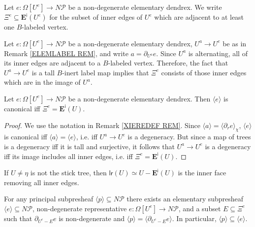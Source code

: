 \documentclass[a4paper,10pt
,draft
]{article}%
\renewcommand{\1}{\eta}%
\begin{document}
\begin{definition}\label{XIEDGES DEF}
Let $e \colon \Omega[U^e] \to N \mathcal{P}$ be a non-degenerate elementary dendrex. 
We write
$\Xi^e \subseteq \boldsymbol{E}^{\mathsf{i}}(U^e)$
for the subset of inner edges of $U^e$ which are adjacent to at least one $B$-labeled vertex.
\end{definition}




\begin{remark}\label{XIEREDEF REM}
Let $e \colon \Omega[U^e] \to N \mathcal{P}$ be a non-degenerate elementary dendrex, 
$U^a \to U^e$ be as in Remark \ref{ELEMLABEL REM}, 
and write $a = \partial_{U^a} e$.
Since $U^a$ is alternating, all of its inner edges are adjacent to a 
$B$-labeled vertex. 
Therefore, the fact that $U^a \to U^e$ is a tall $B$-inert label map
implies that $\Xi^e$ consists of those inner edges which are in the image of $U^a$.
\end{remark}



\begin{proposition}\label{CANIFFXIE PROP}
Let $e \colon \Omega[U^e] \to N \mathcal{P}$ be a non-degenerate elementary dendrex.
%
Then $\langle e \rangle$
is canonical iff $\Xi^e = \boldsymbol{E}^{\mathsf{i}}(U)$.
\end{proposition}

\begin{proof}
We use the notation in Remark \ref{XIEREDEF REM}.
Since $\langle a\rangle = \langle \partial_r e \rangle_{\chi}$, 
$\langle e \rangle$
is canonical 
iff
 $\langle a\rangle = \langle e \rangle$, i.e.
iff
$U^a \to U^e$ is a degeneracy. 
But since a map of trees is a degeneracy iff it is tall and surjective,
it follows that $U^a \to U^e$ is a degeneracy
iff its image includes all inner edges, i.e. iff $\Xi^e = \boldsymbol{E}^{\mathsf{i}}(U)$.
\end{proof}



\begin{remark}\label{WHENLRINN REM}
If $U\neq \eta$ is not the stick tree,
then $\mathsf{lr}(U) \simeq U - \boldsymbol{E}^{\mathsf{i}}(U)$
is the inner face removing all inner edges.
\end{remark}



\begin{lemma}\label{ELEMEXIST LEM}
For any principal subpresheaf $\langle p \rangle \subseteq N \mathcal{P}$
there exists an elementary subpresheaf
$\langle e \rangle \subseteq N \mathcal P$, 
non-degenerate representative 
$e \colon \Omega[U^e] \to N \mathcal{P}$,
and a subset $E \subseteq \Xi^{e}$
such that
 $\partial_{U^e-E} e$ is non-degenerate and 
$\langle p \rangle = \langle \partial_{U^e-E} e \rangle$.
In particular,  
$\langle p \rangle \subseteq \langle e \rangle$.
\end{lemma}
\end{document}

